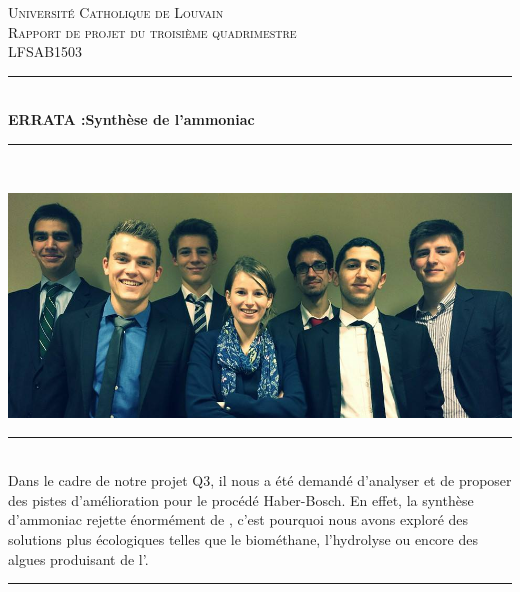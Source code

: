 \documentclass[a4paper]{report}
\newcommand{\HRule}{\rule{\linewidth}{0.5mm}}
\begin{document}
\begin{titlepage}


\begin{center}


\textsc{\Large Université Catholique de Louvain}\\[0.5cm]

\textsc{\LARGE Rapport de projet du troisième quadrimestre}\\[0.2cm]
\textsc{\LARGE LFSAB1503}\\[0.2cm]

\HRule \\[0.2cm]
{\huge \bfseries ERRATA :Synthèse de l'ammoniac}\\
\HRule \\[0.2cm]

\begin{center}
\includegraphics[trim=0cm 0cm 0cm 0cm, clip, width=15cm]{Shema/couverture2.png}
\end{center}
\HRule \\[0.2cm]
Dans le cadre de notre projet Q3, il nous a été demandé d'analyser et de proposer des pistes d'amélioration pour le procédé Haber-Bosch. En effet, la synthèse d'ammoniac rejette énormément de , c'est pourquoi nous avons exploré des solutions plus écologiques telles que le biométhane, l'hydrolyse ou encore des algues produisant de l'.
\HRule \\[0.2cm]


\end{center}
\end{titlepage}
\end{document}
